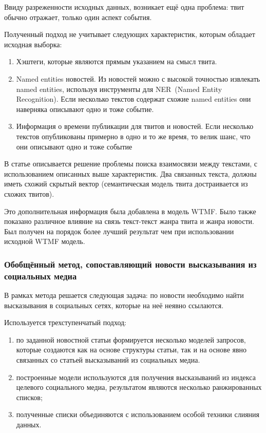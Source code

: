             Ввиду разреженности исходных данных, возникает ещё одна проблема: твит обычно отражает, только один аспект события.

            Полученный подход не учитывает следующих характеристик, которым обладает исходная выборка:
            \begin{enumerate}
                \item Хэштеги, которые являются прямым указанием на смысл твита.
                \item {\color{red} Named entities} новостей. Из новостей можно с высокой точностью извлекать {\color{red} named entities}, используя инструменты для NER~(Named Entity Recognition). Если несколько текстов содержат схожие {\color{red} named entities} они наверняка описывают одно и тоже событие.
                \item Информация о времени публикации для твитов и новостей. Если несколько текстов опубликованы примерно в одно и то же время, то велик шанс, что они описывают одно и тоже событие
            \end{enumerate}
            В статье описывается решение проблемы поиска взаимосвязи между текстами, с использованием описанных выше характеристик. Два связанных текста, должны иметь схожий скрытый вектор (семантическая модель твита достраивается из схожих твитов).

            Это дополнительная информация была добавлена в модель WTMF. Было также показано различное влияние на связь текст-текст жанра твита и жанра новости. Был получен на порядок более лучший результат чем при использовании исходной WTMF модель.

    \subsubsection{Обобщённый метод, сопоставляющий новости высказывания из социальных медиа}
        В рамках метода решается следующая задача: по новости необходимо найти высказывания в социальных сетях, которые на неё неявно ссылаются.

        Используется трехступенчатый подход:
        \begin{enumerate}
            \item по заданной новостной статьи формируется несколько моделей запросов, которые создаются как на основе структуры статьи, так и на основе явно связанных со статьей высказываний из социальных медиа.
            \item построенные модели используются для получения высказываний из индекса целевого социального медиа, результатом являются несколько ранжированных списков;
            \item полученные списки объединяются с использованием особой техники слияния данных.
        \end{enumerate}


